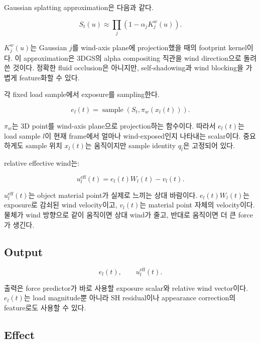 \documentclass[11pt,a4paper]{article}
\begin{document}
Gaussian splatting approximation은 다음과 같다.

\begin{equation}
S_t(u)\approx\prod_j(1-\alpha_jK_j^w(u)).
\end{equation}

$K_j^w(u)$는 Gaussian $j$를 wind-axis plane에 projection했을 때의 footprint kernel이다.
이 approximation은 3DGS의 alpha compositing 직관을 wind direction으로 돌려 쓴 것이다.
정확한 fluid occlusion은 아니지만, self-shadowing과 wind blocking을 가볍게 feature화할 수 있다.

각 fixed load sample에서 exposure를 sampling한다.

\begin{equation}
e_l(t)=\operatorname{sample}(S_t,\pi_w(x_l(t))).
\end{equation}

$\pi_w$는 3D point를 wind-axis plane으로 projection하는 함수이다.
따라서 $e_l(t)$는 load sample $l$이 현재 frame에서 얼마나 wind-exposed인지 나타내는 scalar이다.
중요하게도 sample 위치 $x_l(t)$는 움직이지만 sample identity $q_l$은 고정되어 있다.

relative effective wind는:

\begin{equation}
u_l^{\mathrm{eff}}(t)=e_l(t)W_l(t)-v_l(t).
\end{equation}

$u_l^{\mathrm{eff}}(t)$는 object material point가 실제로 느끼는 상대 바람이다.
$e_l(t)W_l(t)$는 exposure로 감쇠된 wind velocity이고, $v_l(t)$는 material point 자체의 velocity이다.
물체가 wind 방향으로 같이 움직이면 상대 wind가 줄고, 반대로 움직이면 더 큰 force가 생긴다.

\subsection*{Output}

\begin{equation}
e_l(t),\qquad u_l^{\mathrm{eff}}(t).
\end{equation}

출력은 force predictor가 바로 사용할 exposure scalar와 relative wind vector이다.
$e_l(t)$는 load magnitude뿐 아니라 SH residual이나 appearance correction의 feature로도 사용할 수 있다.

\subsection*{Effect}
\end{document}
